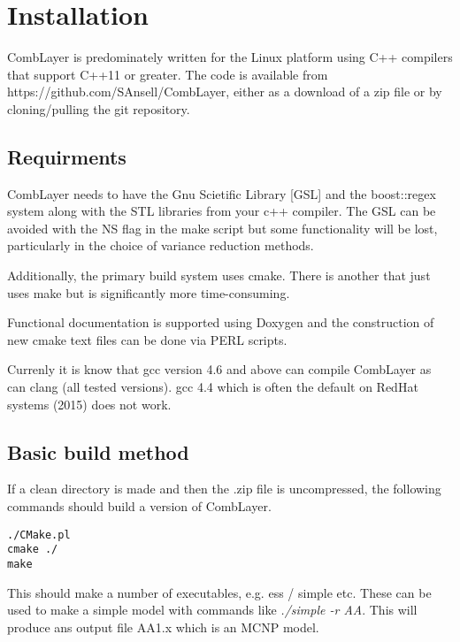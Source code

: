 \section{Installation}

CombLayer is predominately written for the Linux platform using C++
compilers that support C++11 or greater. The code is available from
https://github.com/SAnsell/CombLayer, either as a download of a zip file or
by cloning/pulling the git repository.

\subsection{Requirments}

CombLayer needs to have the Gnu Scietific Library [GSL] and the
boost::regex system along with the STL libraries from your c++
compiler. The GSL can be avoided with the NS flag in the make script
but some functionality will be lost, particularly in the choice
of variance reduction methods.

Additionally, the primary build system uses cmake. There is another
that just uses make but is significantly more time-consuming.

Functional documentation is supported using Doxygen and the construction
of new cmake text files can be done via PERL scripts.

Currenly it is know that gcc version 4.6 and above can compile
CombLayer as can clang (all tested versions). gcc 4.4 which is often
the default on RedHat systems (2015) does not work.

\subsection{Basic build method}

If a clean directory is made and then the .zip file is uncompressed, the
following commands should build a version of CombLayer.

\begin{verbatim}
./CMake.pl
cmake ./
make
\end{verbatim}

This should make a number of executables, e.g. ess / simple etc. These
can be used to make a simple model with commands like {\it ./simple -r
AA}. This will produce ans output file AA1.x which is an MCNP model.



